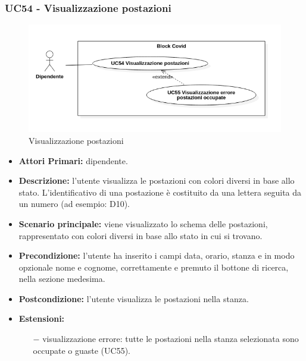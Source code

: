 \subsubsection{ UC54 - Visualizzazione postazioni  }
\begin{figure}[H]
	\centering
	\includegraphics[width=15cm]{res/images/UC54-55.png}
	\caption{Visualizzazione postazioni }
	\label{fig:Visualizzazione postazioni }
\end{figure}
\begin{itemize}
	\item\textbf{Attori Primari:} dipendente.
	\item\textbf{Descrizione:} l’utente visualizza le postazioni con colori diversi in base allo stato. L'identificativo di una postazione è costituito da una lettera seguita da un numero (ad esempio: D10). 
	\item\textbf{Scenario principale:} viene visualizzato lo schema delle postazioni, rappresentato con colori diversi in base allo stato in cui si trovano.
	\item\textbf{Precondizione:} l’utente ha inserito i campi data, orario, stanza e in modo opzionale nome e cognome, correttamente e premuto il bottone di ricerca, nella sezione 
	medesima.
	\item\textbf{Postcondizione:} l’utente visualizza le postazioni nella stanza.
	\item\textbf{Estensioni:}
	\begin{itemize}
		\item[$-$] visualizzazione errore: tutte le postazioni nella stanza selezionata sono occupate o guaste (UC55).
	\end{itemize}
\end{itemize}
